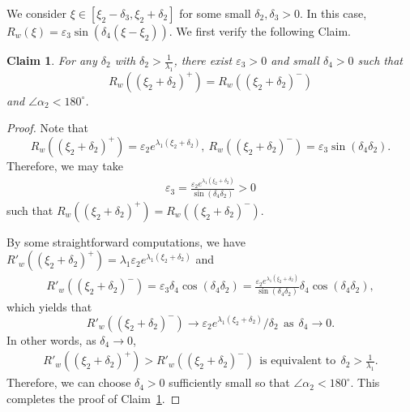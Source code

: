 \documentclass[11pt,a4paper]{article}
\newtheorem{claim}[theorem]{\textbf{Claim}}
\numberwithin{equation}{section}
\numberwithin{figure}{section}
\newcommand\bea{\begin{eqnarray}}
\newcommand\eea{\end{eqnarray}}
\newcommand\beaa{\begin{eqnarray*}}
\newcommand\eeaa{\end{eqnarray*}}
\begin{document}
 We consider $\xi\in[\xi_2-\delta_3,\xi_2+\delta_2]$ for some small $\delta_2,\delta_3>0$. In this case, $R_w(\xi)=\varepsilon_3\sin(\delta_4(\xi-\xi_2))$.
We first verify the following Claim.
\begin{claim}\label{cl scalar}
For any $\delta_2$ with $\delta_2>\frac{1}{\lambda_1}$, there exist
$\varepsilon_3>0$ and small $\delta_4>0$
such that 
$$R_w((\xi_2+\delta_2)^+)=R_w((\xi_2+\delta_2)^-)$$ 
and $\angle\alpha_2<180^{\circ}$.
\end{claim}
\begin{proof}
Note that 
$$R_w((\xi_2+\delta_2)^+)=\varepsilon_2e^{\lambda_1(\xi_2+\delta_2)},\ R_w((\xi_2+\delta_2)^-)=\varepsilon_3\sin(\delta_4\delta_2).$$
Therefore, we may take
\bea\label{epsilon 3}
\varepsilon_3= \frac{\varepsilon_2e^{\lambda_1(\xi_2+\delta_2)}}{\sin(\delta_4\delta_2)}>0
\eea
such that $R_w((\xi_2+\delta_2)^+)=R_w((\xi_2+\delta_2)^-)$.

By some  straightforward computations, we have
$R'_w((\xi_2+\delta_2)^+)=\lambda_1\varepsilon_2e^{\lambda_1(\xi_2+\delta_2)}$ and
\beaa
R'_w((\xi_2+\delta_2)^-)=\varepsilon_3\delta_4\cos(\delta_4\delta_2)=\frac{\varepsilon_2e^{\lambda_1(\xi_2+\delta_2)}}{\sin(\delta_4\delta_2)}\delta_4\cos(\delta_4\delta_2),
\eeaa
which yields that
$$R'_w((\xi_2+\delta_2)^-)\rightarrow \varepsilon_2e^{\lambda_1(\xi_2+\delta_2)}/\delta_2\ \ \text{as}\ \ \delta_4\to0.$$
In other words, as $\delta_4\to0$,
\bea\label{delta 2}
R'_w((\xi_2+\delta_2)^+)>R'_w((\xi_2+\delta_2)^-)\ \ \text{is equivalent to}\ \ \delta_2>\frac{1}{\lambda_1}.
\eea
Therefore, we can choose $\delta_4>0$ sufficiently small so that $\angle\alpha_2<180^{\circ}$.
This completes the proof of Claim~\ref{cl scalar}.
\end{proof}
\end{document}
